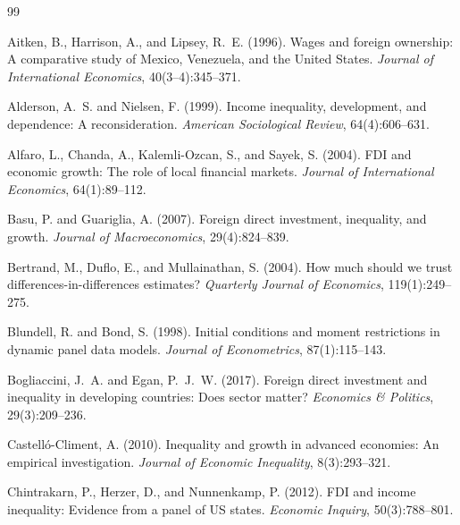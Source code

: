 \documentclass[12pt,a4paper]{article}
\begin{document}
\newpage
\begin{thebibliography}{99}

Aitken, B., Harrison, A., and Lipsey, R.~E. (1996).
\newblock Wages and foreign ownership: A comparative study of Mexico, Venezuela, and the United States.
\newblock \textit{Journal of International Economics}, 40(3--4):345--371.

Alderson, A.~S. and Nielsen, F. (1999).
\newblock Income inequality, development, and dependence: A reconsideration.
\newblock \textit{American Sociological Review}, 64(4):606--631.

Alfaro, L., Chanda, A., Kalemli-Ozcan, S., and Sayek, S. (2004).
\newblock FDI and economic growth: The role of local financial markets.
\newblock \textit{Journal of International Economics}, 64(1):89--112.

Basu, P. and Guariglia, A. (2007).
\newblock Foreign direct investment, inequality, and growth.
\newblock \textit{Journal of Macroeconomics}, 29(4):824--839.

Bertrand, M., Duflo, E., and Mullainathan, S. (2004).
\newblock How much should we trust differences-in-differences estimates?
\newblock \textit{Quarterly Journal of Economics}, 119(1):249--275.

Blundell, R. and Bond, S. (1998).
\newblock Initial conditions and moment restrictions in dynamic panel data models.
\newblock \textit{Journal of Econometrics}, 87(1):115--143.

Bogliaccini, J.~A. and Egan, P.~J.~W. (2017).
\newblock Foreign direct investment and inequality in developing countries: Does sector matter?
\newblock \textit{Economics \& Politics}, 29(3):209--236.

Castell\'o-Climent, A. (2010).
\newblock Inequality and growth in advanced economies: An empirical investigation.
\newblock \textit{Journal of Economic Inequality}, 8(3):293--321.

Chintrakarn, P., Herzer, D., and Nunnenkamp, P. (2012).
\newblock FDI and income inequality: Evidence from a panel of US states.
\newblock \textit{Economic Inquiry}, 50(3):788--801.


\end{thebibliography}
\end{document}
